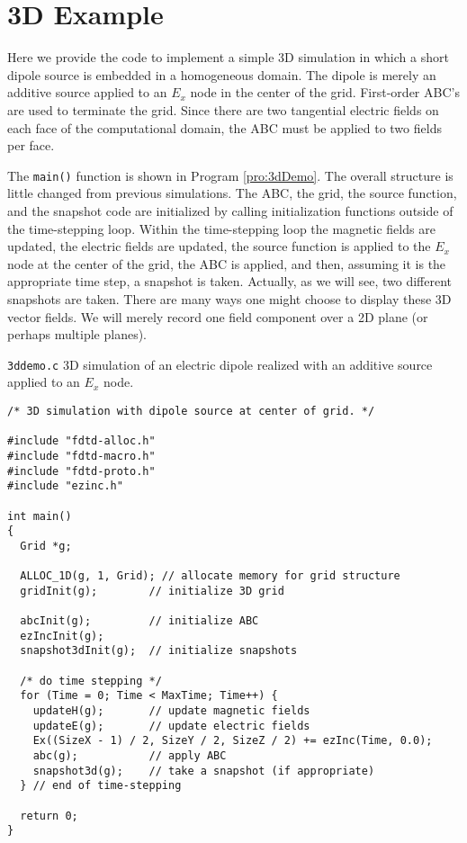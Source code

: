 \section{3D Example}

Here we provide the code to implement a simple 3D simulation in which
a short dipole source is embedded in a homogeneous domain.  The dipole
is merely an additive source applied to an $E_x$ node in the center of
the grid.  First-order ABC's are used to terminate the grid.  Since
there are two tangential electric fields on each face of the
computational domain, the ABC must be applied to two fields per face.

The {\tt main()} function is shown in Program \ref{pro:3dDemo}.  The
overall structure is little changed from previous simulations.  The
ABC, the grid, the source function, and the snapshot code are
initialized by calling initialization functions outside of the
time-stepping loop.  Within the time-stepping loop the magnetic fields
are updated, the electric fields are updated, the source function is
applied to the $E_x$ node at the center of the grid, the ABC is
applied, and then, assuming it is the appropriate time step, a
snapshot is taken.  Actually, as we will see, two different snapshots
are taken.  There are many ways one might choose to display these 3D
vector fields.  We will merely record one field component over a 2D
plane (or perhaps multiple planes).

\begin{program}
{\tt 3ddemo.c} 3D simulation of an electric dipole realized with an
additive source applied to an $E_x$ node.
\label{pro:3dDemo}
\codemiddle
\begin{lstlisting}
/* 3D simulation with dipole source at center of grid. */

#include "fdtd-alloc.h"
#include "fdtd-macro.h" 
#include "fdtd-proto.h"
#include "ezinc.h"

int main()
{
  Grid *g;

  ALLOC_1D(g, 1, Grid); // allocate memory for grid structure
  gridInit(g);        // initialize 3D grid

  abcInit(g);         // initialize ABC
  ezIncInit(g);
  snapshot3dInit(g);  // initialize snapshots

  /* do time stepping */
  for (Time = 0; Time < MaxTime; Time++) {
    updateH(g);       // update magnetic fields 
    updateE(g);       // update electric fields 
    Ex((SizeX - 1) / 2, SizeY / 2, SizeZ / 2) += ezInc(Time, 0.0);
    abc(g);           // apply ABC
    snapshot3d(g);    // take a snapshot (if appropriate)
  } // end of time-stepping

  return 0;
}
\end{lstlisting}
\end{program}

